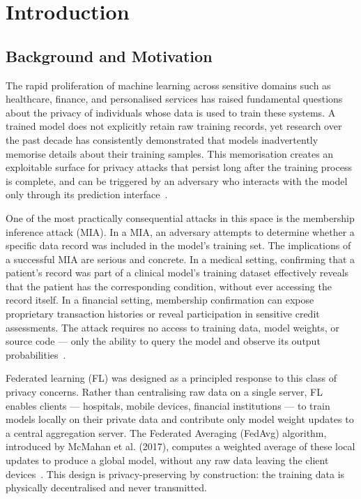 \documentclass[12pt, a4paper]{report}
\begin{document}
\chapter{Introduction}

\section{Background and Motivation}

The rapid proliferation of machine learning across sensitive domains such as
healthcare, finance, and personalised services has raised fundamental questions
about the privacy of individuals whose data is used to train these systems. A
trained model does not explicitly retain raw training records, yet research over
the past decade has consistently demonstrated that models inadvertently memorise
details about their training samples. This memorisation creates an exploitable
surface for privacy attacks that persist long after the training process is
complete, and can be triggered by an adversary who interacts with the model only
through its prediction interface~\cite{bai2024survey,dayal2023}.

One of the most practically consequential attacks in this space is the membership
inference attack (MIA). In a MIA, an adversary attempts to determine whether a
specific data record was included in the model's training set. The implications
of a successful MIA are serious and concrete. In a medical setting, confirming
that a patient's record was part of a clinical model's training dataset effectively
reveals that the patient has the corresponding condition, without ever accessing
the record itself. In a financial setting, membership confirmation can expose
proprietary transaction histories or reveal participation in sensitive credit
assessments. The attack requires no access to training data, model weights, or
source code --- only the ability to query the model and observe its output
probabilities~\cite{pavlidis2025healthcare,pati2024health}.

Federated learning (FL) was designed as a principled response to this class of
privacy concerns. Rather than centralising raw data on a single server, FL
enables clients --- hospitals, mobile devices, financial institutions --- to
train models locally on their private data and contribute only model weight
updates to a central aggregation server. The Federated Averaging (FedAvg)
algorithm, introduced by McMahan et al. (2017), computes a weighted average of
these local updates to produce a global model, without any raw data leaving the
client devices~\cite{bai2024survey}. This design is privacy-preserving by
construction: the training data is physically decentralised and never transmitted.
\end{document}
